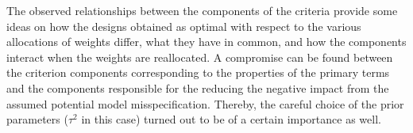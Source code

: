 The observed relationships between the components of the criteria provide some ideas on how the designs obtained as optimal with respect to the various allocations of weights differ, what they have in common, and how the components interact when the weights are reallocated. A compromise can be found between the criterion components corresponding to the properties of the primary terms and the components responsible for the reducing the negative impact from the assumed potential model misspecification. Thereby, the careful choice of the prior parameters ($\tau^2$ in this case) turned out to be of a certain importance as well. 